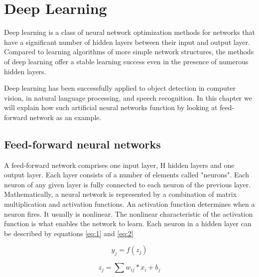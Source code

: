 \chapter{Deep Learning}

Deep learning is a class of neural network optimization methods for networks that have
 a significant number of hidden layers between their input and output layer.
  Compared to learning algorithms of more simple network structures, the methods of 
  deep learning offer a stable learning success even in the presence of numerous hidden layers.

Deep learning has been successfully applied to object detection in computer vision, in natural language processing,
 and speech recognition. In this chapter we will explain how such artificial neural networks 
 function by looking at feed-forward network as an example.\cite{Dao} 

\section{Feed-forward neural networks}

A feed-forward network comprises one input layer, H hidden layers and one output layer.
Each layer consists of a number of elements called "neurons". Each neuron of any given layer is 
fully connected to each neuron
of the previous layer. Mathematically, a neural network is represented by a combination of 
matrix multiplication and
activation functions. An activation function determines when a neuron fires.
It usually is nonlinear. The nonlinear characteristic of the activation function is 
what enables the network to learn. Each neuron in a hidden layer can be described by equations \ref{eq:1} and  \ref{eq:2}

\begin{equation} \label{eq:1}
	y_{j} = f(z_{j})
\end{equation}

\begin{equation} \label{eq:2}
z_{j} = \sum w_{ij}*x_{i} + b_{j}
\end{equation}

